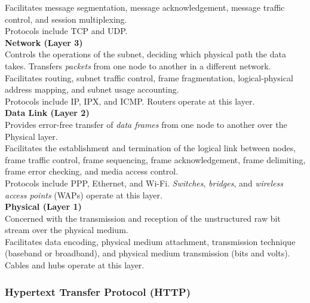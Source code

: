 \documentclass[12pt, titlepage]{article}
\begin{document}
Facilitates message segmentation, message acknowledgement, message traffic control, and session multiplexing. \\

Protocols include TCP and UDP. \\

\textbf{Network (Layer 3)} \\

Controls the operations of the subnet, deciding which physical path the data takes. Transfers \textit{packets} from one node to another in a different network. \\

Facilitates routing, subnet traffic control, frame fragmentation, logical-physical address mapping, and subnet usage accounting. \\

Protocols include IP, IPX, and ICMP. Routers operate at this layer. \\

\textbf{Data Link (Layer 2)} \\

Provides error-free transfer of \textit{data frames} from one node to another over the Physical layer. \\

Facilitates the establishment and termination of the logical link between nodes, frame traffic control, frame sequencing, frame acknowledgement, frame delimiting, frame error checking, and media access control. \\

Protocols include PPP, Ethernet, and Wi-Fi. \textit{Switches}, \textit{bridges}, and \textit{wireless access points} (WAPs) operate at this layer. \\

\textbf{Physical (Layer 1)} \\

Concerned with the transmission and reception of the unstructured raw bit stream over the physical medium. \\

Facilitates data encoding, physical medium attachment, transmission technique (baseband or broadband), and physical medium transmission (bits and volts). \\

Cables and hubs operate at this layer. \\

\subsubsection{Hypertext Transfer Protocol (HTTP)}
\end{document}
